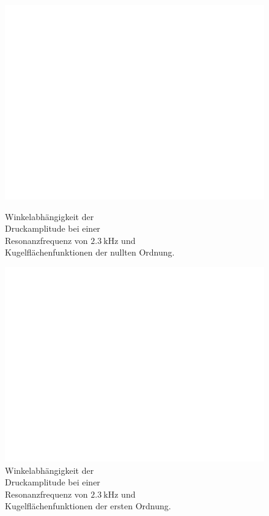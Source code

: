 \FloatBarrier
\begin{figure}
    \hspace*{2cm}
    \begin{minipage}[b]{.4\linewidth} %
        \hspace*{-2cm}
        \includegraphics[width=\linewidth]{figure/9mmZwischenring_n0.pdf}
        \caption{Winkelabhängigkeit der\\ Druckamplitude bei einer \\ Resonanzfrequenz von $\SI{2.3}{\kilo\hertz}$ und \\ Kugelflächenfunktionen der nullten Ordnung.}
     \end{minipage}
     \hspace{.1\linewidth}%
     \begin{minipage}[b]{.4\linewidth} %
        \hspace*{-2cm}
        \includegraphics[width=\linewidth]{figure/9mmZwischenring_n1.pdf}
        \caption{Winkelabhängigkeit der\\ Druckamplitude bei einer \\ Resonanzfrequenz von $\SI{2.3}{\kilo\hertz}$ und \\ Kugelflächenfunktionen der ersten Ordnung.}
     \end{minipage}
\end{figure}
